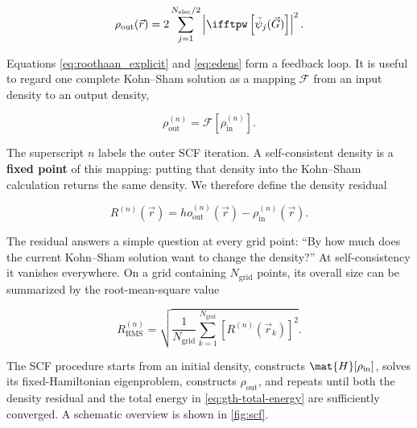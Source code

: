 \begin{equation}
    \rho_{\text{out}}(\vec{r}) = 2\sum_{j=1}^{N_{\text{elec}} / 2} \left|\ifftpw \left[ \tilde{\psi}_{j}(\vec{G}) \right] \right|^{2}.
    \label{eq:edens}
\end{equation}

Equations \eqref{eq:roothaan_explicit} and \eqref{eq:edens} form a feedback loop. It is useful to regard one complete Kohn--Sham solution as a mapping \(\mathcal{F}\) from an input density to an output density,

\begin{equation}
    \rho_{\text{out}}^{(n)}=\mathcal{F}\left[\rho_{\text{in}}^{(n)}\right].
    \label{eq:scf-map}
\end{equation}

The superscript \(n\) labels the outer SCF iteration. A self-consistent density is a \textbf{fixed point} of this mapping: putting that density into the Kohn--Sham calculation returns the same density. We therefore define the density residual

\begin{equation}
    R^{(n)}(\vec{r})=
ho_{\text{out}}^{(n)}(\vec{r})
    -\rho_{\text{in}}^{(n)}(\vec{r}).
    \label{eq:density-residual}
\end{equation}

The residual answers a simple question at every grid point: ``By how much does the current Kohn--Sham solution want to change the density?'' At self-consistency it vanishes everywhere. On a grid containing \(N_{\text{grid}}\) points, its overall size can be summarized by the root-mean-square value

\begin{equation}
    R_{\text{RMS}}^{(n)}=
    \sqrt{\frac{1}{N_{\text{grid}}}
    \sum_{k=1}^{N_{\text{grid}}}
    \left[R^{(n)}(\vec{r}_{k})\right]^{2}}.
    \label{eq:density-residual-rms}
\end{equation}

The SCF procedure starts from an initial density, constructs \(\mat{H}[\rho_{\text{in}}]\), solves its fixed-Hamiltonian eigenproblem, constructs \(\rho_{\text{out}}\), and repeats until both the density residual and the total energy in \cref{eq:gth-total-energy} are sufficiently converged. A schematic overview is shown in \cref{fig:scf}.

\begin{Figure}
    \centering
    \resizebox{0.9 \textwidth}{!}{
        
    }
    \label{fig:scf}
\end{Figure}

